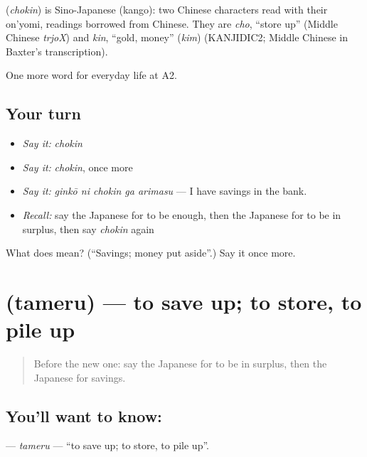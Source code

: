 \begin{cousinweb}
\textbf{} (\emph{chokin}) is Sino-Japanese (kango): two Chinese characters read with their on'yomi, readings borrowed from Chinese. They are \emph{cho}, \textquotedblleft{}store up\textquotedblright{} (Middle Chinese \emph{trjoX}) and \emph{kin}, \textquotedblleft{}gold, money\textquotedblright{} (\emph{kim}) (KANJIDIC2; Middle Chinese in Baxter's transcription).
\end{cousinweb}

\begin{grammarlens}[title={What you've built}]
One more word for everyday life at A2.
\end{grammarlens}

\subsection*{Your turn}
\begin{itemize}
\raggedright
  \item \emph{Say it:} \emph{chokin}
  \item \emph{Say it:} \emph{chokin}, once more
  \item \emph{Say it:} \emph{ginkō ni chokin ga arimasu} — I have savings in the bank.
  \item \emph{Recall:} say the Japanese for to be enough, then the Japanese for to be in surplus, then say \emph{chokin} again
\end{itemize}

\begin{tcolorbox}[breakable,colback=teal!4,colframe=teal!35!black,title={Before you move on}]
What does  mean? (\textquotedblleft{}Savings; money put aside\textquotedblright{}.) Say it once more.
\end{tcolorbox}
\section[\texorpdfstring{\ja{ためる} (tameru)}{ためる (tameru)}]{ (tameru) — to save up; to store, to pile up}

\label{lesson:JA-C186-tameru}



\begin{quote}
Before the new one: say the Japanese for to be in surplus, then the Japanese for savings.
\end{quote}

\subsection*{You'll want to know: }
\textbf{} — \emph{tameru} — \textquotedblleft{}to save up; to store, to pile up\textquotedblright{}.

